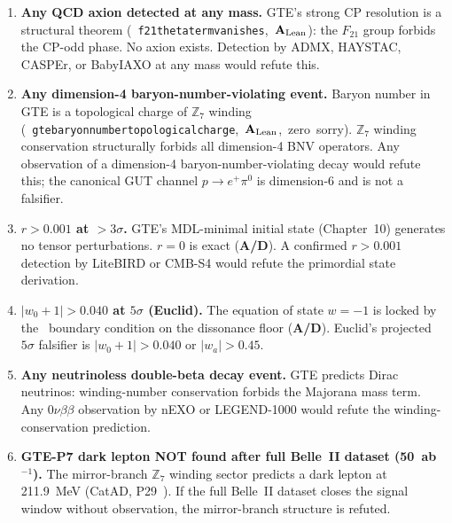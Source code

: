\documentclass[11pt,openany]{book}
\theoremstyle{remark}
\newcommand{\PSC}{\text{PSC}}
\newcommand{\ZS}{\mathbb{Z}_7}
\newcommand{\lean}[1]{%
  \penalty-100
  \begingroup\def\_{\textunderscore\allowbreak}\texttt{#1}\endgroup}
\newcommand{\CatAL}{\ensuremath{\textbf{A}_{\rm Lean}}}
\newcommand{\CatAD}{\textbf{A/D}}
\begin{document}
\begin{tcolorbox}[colback=red!5,colframe=red!60,
  title={Six Definitive Falsification Criteria}]
\begin{enumerate}
\item \textbf{Any QCD axion detected at any mass.}
  GTE's strong CP resolution is a structural theorem \mbox{(\lean{f21\_theta\_term\_vanishes}, \CatAL)}:
  the $F_{21}$ group forbids the CP-odd phase.  No axion exists.  Detection by
  ADMX, HAYSTAC, CASPEr, or BabyIAXO at any mass would refute this.

\item \textbf{Any dimension-4 baryon-number-violating event.}
  Baryon number in GTE is a topological charge of $\ZS$ winding \mbox{(\lean{gte\_baryon\_number\_topological\_charge}, \CatAL, zero sorry)}.  $\mathbb{Z}_7$
  winding conservation structurally forbids all dimension-4 BNV operators.
  Any observation of a dimension-4 baryon-number-violating decay would refute this;
  the canonical GUT channel $p\to e^+\pi^0$ is dimension-6 and is not a falsifier.

\item \textbf{$r > 0.001$ at $>3\sigma$.}
  GTE's MDL-minimal initial state (Chapter~10) generates no tensor perturbations.
  $r=0$ is exact (\CatAD).  A confirmed $r>0.001$ detection by LiteBIRD or CMB-S4
  would refute the primordial state derivation.

\item \textbf{$|w_0+1| > 0.040$ at $5\sigma$ (Euclid).}
  The equation of state $w=-1$ is locked by the \PSC\ boundary condition on the
  dissonance floor (\CatAD).  Euclid's projected $5\sigma$ falsifier is
  $|w_0+1| > 0.040$ or $|w_a| > 0.45$.

\item \textbf{Any neutrinoless double-beta decay event.}
  GTE predicts Dirac neutrinos: winding-number conservation forbids the Majorana
  mass term.  Any $0\nu\beta\beta$ observation by nEXO or LEGEND-1000 would refute
  the winding-conservation prediction.

\item \textbf{GTE-P7 dark lepton NOT found after full Belle~II dataset (50~ab$^{-1}$).}
  The mirror-branch $\mathbb{Z}_7$ winding sector predicts a dark lepton at 211.9~MeV
  (CatAD, P29~\cite{SpivackMirrorBraidAtlas}).  If the full Belle~II dataset closes the
  signal window without observation, the mirror-branch structure is refuted.
\end{enumerate}
\end{tcolorbox}
\end{document}
